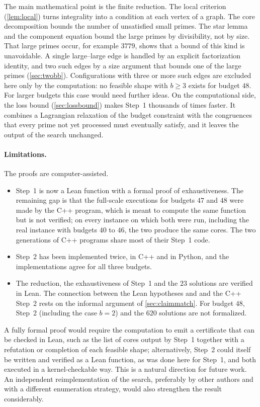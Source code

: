 \documentclass[11pt]{article}
\begin{document}
The main mathematical point is the finite reduction. The local criterion (\cref{lem:local}) turns integrality into a condition at each vertex of a graph. The core decomposition bounds the number of unsatisfied small primes. The star lemma and the component equation bound the large primes by divisibility, not by size.
That large primes occur, for example $3779$, shows that a bound of this kind is unavoidable.
A single large--large edge is handled by an explicit factorization identity, and two such edges by a size argument that bounds one of the large primes (\cref{sec:twobb}). Configurations with three or more such edges are excluded here only by the computation: no feasible shape with $b\ge3$ exists for budget $48$. For larger budgets this case would need further ideas.
On the computational side, the loss bound (\cref{sec:lossbound}) makes Step~1 thousands of times faster. It combines a Lagrangian relaxation of the budget constraint with the congruences that every prime not yet processed must eventually satisfy, and it leaves the output of the search unchanged.

\paragraph{Limitations.}
The proofs are computer-assisted.
\begin{itemize}
\item Step~1 is now a Lean function with a formal proof of exhaustiveness. The remaining gap is that the full-scale executions for budgets $47$ and $48$ were made by the C++ program, which is meant to compute the same function but is not verified; on every instance on which both were run, including the real instance with budgets $40$ to $46$, the two produce the same cores. The two generations of C++ programs share most of their Step~1 code.
\item Step~2 has been implemented twice, in C++ and in Python, and the implementations agree for all three budgets.
\item The reduction, the exhaustiveness of Step~1 and the $23$ solutions are verified in Lean. The connection between the Lean hypotheses  and  and the C++ Step~2 rests on the informal argument of \cref{sec:claimmatch}. For budget $48$, Step~2 (including the case $b=2$) and the $620$ solutions are not formalized.
\end{itemize}
A fully formal proof would require the computation to emit a certificate that can be checked in Lean, such as the list of cores output by Step~1 together with a refutation or completion of each feasible shape; alternatively, Step~2 could itself be written and verified as a Lean function, as was done here for Step~1, and both executed in a kernel-checkable way. This is a natural direction for future work.
An independent reimplementation of the search, preferably by other authors and with a different enumeration strategy, would also strengthen the result considerably.
\end{document}
